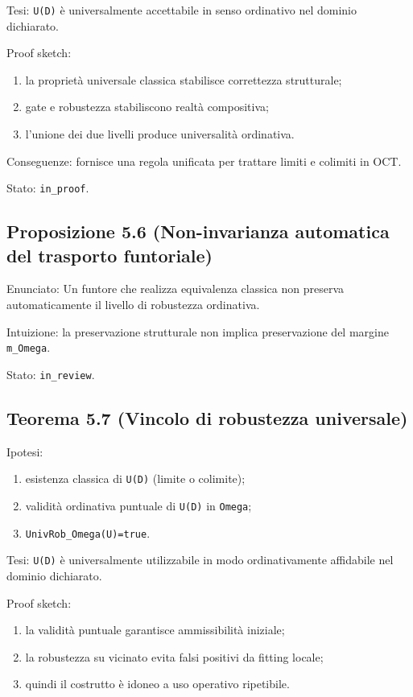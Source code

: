 Tesi:
\texttt{U(D)} è universalmente accettabile in senso ordinativo nel dominio dichiarato.

Proof sketch:

\begin{enumerate}
\def\labelenumi{\arabic{enumi}.}
\tightlist
\item
  la proprietà universale classica stabilisce correttezza strutturale;
\item
  gate e robustezza stabiliscono realtà compositiva;
\item
  l'unione dei due livelli produce universalità ordinativa.
\end{enumerate}

Conseguenze:
fornisce una regola unificata per trattare limiti e colimiti in OCT.

Stato: \texttt{in\_proof}.

\subsection{Proposizione 5.6 (Non-invarianza automatica del trasporto funtoriale)}

Enunciato:
Un funtore che realizza equivalenza classica non preserva automaticamente il livello di robustezza ordinativa.

Intuizione:
la preservazione strutturale non implica preservazione del margine \texttt{m\_Omega}.

Stato: \texttt{in\_review}.

\subsection{Teorema 5.7 (Vincolo di robustezza universale)}

Ipotesi:

\begin{enumerate}
\def\labelenumi{\arabic{enumi}.}
\tightlist
\item
  esistenza classica di \texttt{U(D)} (limite o colimite);
\item
  validità ordinativa puntuale di \texttt{U(D)} in \texttt{Omega};
\item
  \texttt{UnivRob\_Omega(U)=true}.
\end{enumerate}

Tesi:
\texttt{U(D)} è universalmente utilizzabile in modo ordinativamente affidabile nel dominio dichiarato.

Proof sketch:

\begin{enumerate}
\def\labelenumi{\arabic{enumi}.}
\tightlist
\item
  la validità puntuale garantisce ammissibilità iniziale;
\item
  la robustezza su vicinato evita falsi positivi da fitting locale;
\item
  quindi il costrutto è idoneo a uso operativo ripetibile.
\end{enumerate}

